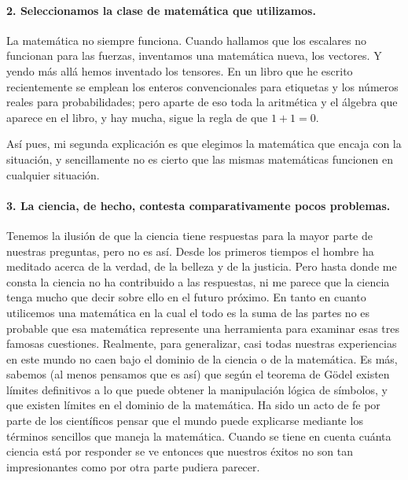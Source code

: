 \documentclass[a4paper, 12pt]{article}
\begin{document}
 

\paragraph*{2. Seleccionamos la clase de matemática que utilizamos.}

 La matemática no siempre funciona. Cuando hallamos que los escalares no funcionan para las fuerzas, inventamos una matemática nueva, los vectores. Y yendo más allá hemos inventado los tensores. En un libro que he escrito recientemente  se emplean los enteros convencionales para etiquetas y los números reales para probabilidades; pero aparte de eso toda la aritmética y el álgebra que aparece en el libro, y hay mucha, sigue la regla de que $1+1=0$.

 

Así pues, mi segunda explicación es que elegimos la matemática que encaja con la situación, y sencillamente no es cierto que las mismas matemáticas funcionen en cualquier situación.

 

\paragraph*{3. La ciencia, de hecho, contesta comparativamente pocos problemas.}

 Tenemos la ilusión de que la ciencia tiene respuestas para la mayor parte de nuestras preguntas, pero no es así. Desde los primeros tiempos el hombre ha meditado acerca de la verdad, de la belleza y de la justicia. Pero hasta donde me consta la ciencia no ha contribuido a las respuestas, ni me parece que la ciencia tenga mucho que decir sobre ello en el futuro próximo. En tanto en cuanto utilicemos una matemática en la cual el todo es la suma de las partes no es probable que esa matemática represente una herramienta para examinar esas tres famosas cuestiones. Realmente, para generalizar, casi todas nuestras experiencias en este mundo no caen bajo el dominio de la ciencia o de la matemática. Es más, sabemos (al menos pensamos que es así) que según el teorema de Gödel existen límites definitivos a lo que puede obtener la manipulación lógica de símbolos, y que existen límites en el dominio de la matemática. Ha sido un acto de fe por parte de los científicos pensar que el mundo puede explicarse mediante los términos sencillos que maneja la matemática. Cuando se tiene en cuenta cuánta ciencia está por responder se ve entonces que nuestros éxitos no son tan impresionantes como por otra parte pudiera parecer.
\end{document}
